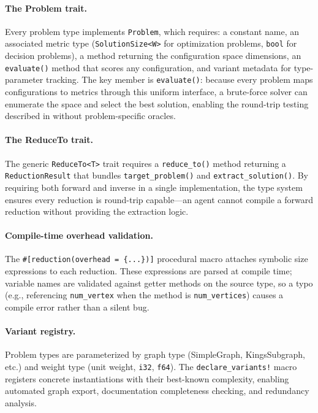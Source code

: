 \documentclass[conference]{IEEEtran}
\begin{document}
\paragraph{The Problem trait.}
Every problem type implements \texttt{Problem}, which requires: a constant name, an associated metric type (\texttt{SolutionSize<W>} for optimization problems, \texttt{bool} for decision problems), a method returning the configuration space dimensions, an \lstinline{evaluate()} method that scores any configuration, and variant metadata for type-parameter tracking.
The key member is \lstinline{evaluate()}: because every problem maps configurations to metrics through this uniform interface, a brute-force solver can enumerate the space and select the best solution, enabling the round-trip testing described in  without problem-specific oracles.

\paragraph{The ReduceTo trait.}
The generic \lstinline{ReduceTo<T>} trait requires a \lstinline{reduce_to()} method returning a \texttt{ReductionResult} that bundles \lstinline{target_problem()} and \lstinline{extract_solution()}.
By requiring both forward and inverse in a single implementation, the type system ensures every reduction is round-trip capable---an agent cannot compile a forward reduction without providing the extraction logic.

\paragraph{Compile-time overhead validation.}
The \texttt{\#[reduction(overhead = \{...\})]} procedural macro attaches symbolic size expressions to each reduction.
These expressions are parsed at compile time; variable names are validated against getter methods on the source type, so a typo (e.g., referencing \lstinline{num_vertex} when the method is \lstinline{num_vertices}) causes a compile error rather than a silent bug.

\paragraph{Variant registry.}
Problem types are parameterized by graph type (SimpleGraph, KingsSubgraph, etc.) and weight type (unit weight, \texttt{i32}, \texttt{f64}).
The \lstinline{declare_variants!} macro registers concrete instantiations with their best-known complexity, enabling automated graph export, documentation completeness checking, and redundancy analysis.
\end{document}
